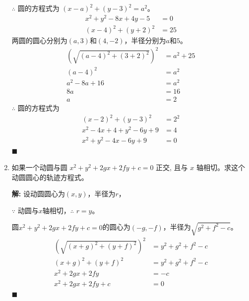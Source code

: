\documentclass[10pt]{article}
\newcommand{\sol}{\textbf{解:} }
\begin{document}
\begin{enumerate}[leftmargin=*]
        $\therefore$ 圆的方程式为 $(x - a)^{2} + (y - 3)^{2} = a^{2}$。
        \begin{align*}
          x^{2}+y^{2}-8 x+4 y-5     & = 0  \\
          (x - 4)^{2} + (y + 2)^{2} & = 25
        \end{align*}
        两圆的圆心分别为$(a, 3)$和$(4, -2)$，半径分别为$a$和$5$。
        \begin{align*}
          \left(\sqrt{(a - 4)^{2} + (3 + 2)^{2}}\right)^{2} & = a^{2} + 25 \\
          (a - 4)^{2}                                       & = a^{2}      \\
          a^2 - 8a + 16                                     & = a^2        \\
          8a                                                & = 16         \\
          a                                                 & = 2
        \end{align*}
        $\therefore$ 圆的方程式为\begin{align*}
          (x - 2)^{2} + (y - 3)^{2}       & = 2^{2} \\
          x^{2} - 4x + 4 + y^{2} - 6y + 9 & = 4     \\
          x^{2} + y^{2} - 4x - 6y + 9     & = 0
        \end{align*} \hfill$\blacksquare$

  \item 如果一个动圆与圆 $x^{2}+y^{2}+2 g x+2 f y+c=0$ 正交, 且与 $x$ 轴相切。求这个动圆圆心的轨迹方程式。

        \sol{}
        设动圆圆心为$(x, y)$，半径为$r$，

        $\because$ 动圆与$x$轴相切，$\therefore$ $r = y$。

        圆$x^{2}+y^{2}+2 g x+2 f y+c=0$的圆心为$(-g, -f)$，半径为$\sqrt{g^2 + f^2 - c}$。
        \begin{align*}
          \left(\sqrt{(x + g)^{2} + (y + f)^{2}}\right)^{2} & = y^2 + g^2 + f^2 - c \\
          (x + g)^{2} + (y + f)^{2}                         & = y^2 + g^2 + f^2 - c \\
          x^2 + 2gx + 2fy                                   & = - c                 \\
          x^2 + 2gx + 2fy + c                               & = 0
        \end{align*} \hfill$\blacksquare$



\end{enumerate}
\end{document}
